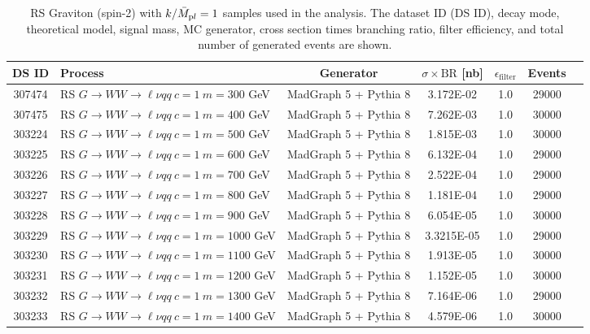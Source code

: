 \begin{landscape}

\begin{table}[!htb]
\caption[RS Graviton Monte Carlo samples]{RS Graviton (spin-2) with $k/\bar{M}_{\textrm pl}=1$ samples used in the analysis. The dataset ID (DS ID), decay mode, theoretical model, signal mass, MC generator, cross section times branching ratio, filter efficiency, and total number of generated events are shown.}
\label{tabular:mc_samples_graviton}
\begin{footnotesize}
\begin{center}
\begin{tabular}{c|l|c|c|c|cr}
	\hline\hline
	DS ID  & Process & Generator & $\sigma\times\text{BR}$ [nb]  & $\epsilon_{\text{filter}}$ & Events \\ \hline\hline
	307474 & RS $G \to WW \to \ell\nu qq ~c=1  ~m=300$ GeV& MadGraph 5 + Pythia 8 & 3.172E-02  & 1.0 & 29000 \\
	307475 & RS $G \to WW \to \ell\nu qq ~c=1  ~m=400$ GeV& MadGraph 5 + Pythia 8 & 7.262E-03  & 1.0 & 30000 \\
  303224 & RS $G \to WW \to \ell\nu qq ~c=1  ~m=500$ GeV& MadGraph 5 + Pythia 8 & 1.815E-03   &1.0& 30000 \\
  303225 & RS $G \to WW \to \ell\nu qq ~c=1  ~m=600$ GeV& MadGraph 5 + Pythia 8 & 6.132E-04   &1.0& 29000 \\
  303226 & RS $G \to WW \to \ell\nu qq ~c=1  ~m=700$ GeV& MadGraph 5 + Pythia 8 & 2.522E-04   &1.0& 29000 \\
  303227 & RS $G \to WW \to \ell\nu qq ~c=1  ~m=800$ GeV& MadGraph 5 + Pythia 8 & 1.181E-04   &1.0& 29000 \\
  303228 & RS $G \to WW \to \ell\nu qq ~c=1  ~m=900$ GeV& MadGraph 5 + Pythia 8 & 6.054E-05   &1.0& 30000 \\
  303229 & RS $G \to WW \to \ell\nu qq ~c=1 ~m=1000$ GeV& MadGraph 5 + Pythia 8 & 3.3215E-05  &1.0& 29000 \\
  303230 & RS $G \to WW \to \ell\nu qq ~c=1 ~m=1100$ GeV& MadGraph 5 + Pythia 8 & 1.913E-05   &1.0& 30000 \\
  303231 & RS $G \to WW \to \ell\nu qq ~c=1 ~m=1200$ GeV& MadGraph 5 + Pythia 8 & 1.152E-05   &1.0& 30000 \\
  303232 & RS $G \to WW \to \ell\nu qq ~c=1 ~m=1300$ GeV& MadGraph 5 + Pythia 8 & 7.164E-06   &1.0& 29000 \\
  303233 & RS $G \to WW \to \ell\nu qq ~c=1 ~m=1400$ GeV& MadGraph 5 + Pythia 8 & 4.579E-06   &1.0& 30000 \\

\end{tabular}
\end{center}
\end{footnotesize}
\end{table}
\end{landscape}
